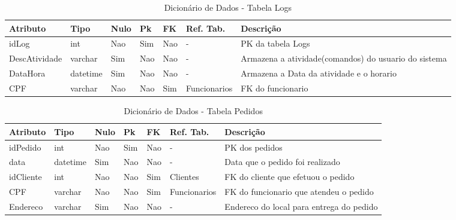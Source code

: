 \documentclass[
	12pt,				%
	openright,			%
	oneside,			%
	a4paper,			%
	chapter=TITLE,		%
	section=TITLE,		%
	english,			%
	brazil				%
	]{abntex2}
\begin{document}
    \begin{table}[htbp]
        \caption{Dicionário de Dados - Tabela Logs}
        \label{tb1_dicionario_dados_logs}
        \begin{tabular}{|l|l|l|l|l|l|p{3cm}|}
            \hline
            \textbf{Atributo} & 
            \textbf{Tipo} & 
            \textbf{Nulo} & 
            \textbf{Pk} & 
            \textbf{FK} & 
            \textbf{Ref. Tab.} & 
            \textbf{Descrição} \\ \hline
            idLog & int & Nao & Sim & Nao & - & PK da tabela Logs \\ \hline
            DescAtividade & varchar & Sim & Nao & Nao & - & Armazena a atividade(comandos) do usuario do sistema \\ \hline
            DataHora & datetime & Sim & Nao & Nao & - & Armazena a Data da atividade e o horario \\ \hline
            CPF & varchar & Nao & Nao & Sim & Funcionarios & FK do funcionario \\ \hline
        \end{tabular}
    \end{table}
    
    \begin{table}[htbp]
        \caption{Dicionário de Dados - Tabela Pedidos}
        \label{tb1_dicionario_dados_pedidos}
        \begin{tabular}{|l|l|l|l|l|l|p{3cm}|}
            \hline 
            \textbf{Atributo} & 
            \textbf{Tipo} & 
            \textbf{Nulo} & 
            \textbf{Pk} & 
            \textbf{FK} & 
            \textbf{Ref. Tab.} & 
            \textbf{Descrição} \\ \hline
            idPedido & int & Nao & Sim & Nao & - & PK dos pedidos \\ \hline
            data & datetime & Sim & Nao & Nao & - & Data que o pedido foi realizado \\ \hline
            idCliente & int & Nao & Nao & Sim & Clientes & FK do cliente que efetuou o pedido \\ \hline
            CPF & varchar & Nao & Nao & Sim & Funcionarios & FK do funcionario que atendeu o pedido \\ \hline
            Endereco & varchar & Sim & Nao & Nao & - & Endereco do local para entrega do pedido \\ \hline
        \end{tabular}
    \end{table}
    
\end{document}
